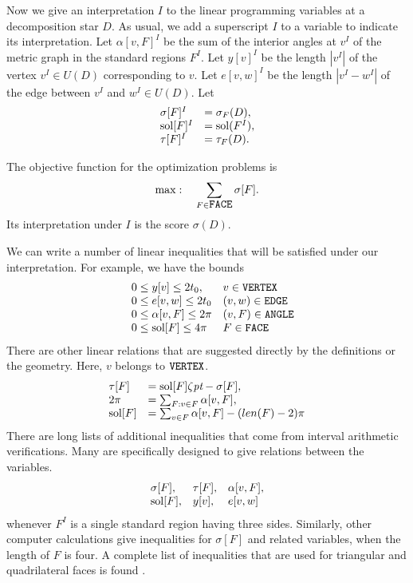 Now we give an interpretation $I$ to the linear programming
variables at a decomposition star $D$.   As usual, we add a
superscript $I$ to a variable to indicate its interpretation. Let
$\alpha[v,F]^I$ be the sum of the interior angles at $v^I$ of the
metric graph in the standard regions $F^I$. Let $y[v]^I$ be the
length $|v^I|$ of the vertex $v^I\in U(D)$ corresponding to $v$.
Let $e[v,w]^I$ be the length $|v^I-w^I|$ of the edge between $v^I$
and $w^I\in U(D)$. Let
    $$\begin{array}{lll}
    \sigma[F]^I &= \sigma_F(D),\\
    \operatorname{sol}[F]^I &= \operatorname{sol}(F^I),\\
    \tau[F]^I &= \tau_F(D).
    \end{array}
    $$

The objective function for the optimization problems is
    $$\max:\quad \sum_{F\in\hbox{\tt FACE}} \sigma[F].$$
Its interpretation under $I$ is the score $\sigma(D)$.

We can write a number of linear inequalities  that will be
 satisfied under our interpretation.  For example, we
have the bounds
    $$
    \begin{array}{lll}
    &0\le y[v]\le 2t_0, &v\in \hbox{\tt VERTEX}\\
    &0\le e[v,w]\le 2t_0 &(v,w)\in\hbox{\tt EDGE}\\
    &0\le \alpha[v,F]\le 2\pi &(v,F)\in\hbox{\tt ANGLE}\\
    &0\le \operatorname{sol}[F]\le 4\pi &F\in\hbox{\tt FACE}\\
    \end{array}
    $$
There are other linear relations that are suggested directly by the
definitions or the geometry.  Here, $v$ belongs to $\hbox{\tt VERTEX}$.
    $$
    \begin{array}{lll}
    \tau[F] &= \operatorname{sol}[F] \zeta\hbox{\it pt} - \sigma[F],\\
    2\pi &= \sum_{F: v\in F} \alpha[v,F],\\
    \operatorname{sol}[F] &= \sum_{v\in F}\alpha[v,F] - (len(F)-2)\pi\\
    \end{array}
    $$
There are long lists of additional inequalities that come from
interval arithmetic verifications. Many are specifically designed
to give relations between the variables.
    $$
    \begin{array}{lll}
    \sigma[F],&\tau[F],&\alpha[v,F],\\
    \operatorname{sol}[F],&y[v],&e[v,w]
    \end{array}
    $$
whenever $F^I$ is a single standard region having three sides.
Similarly, other computer calculations give inequalities for
$\sigma[F]$ and related variables, when the length of $F$ is four.
A complete list of inequalities that are used for triangular and
quadrilateral faces is found \cite{web}.

